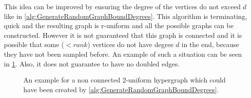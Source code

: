 This idea can be improved by ensuring the degree of the vertices do not exceed $d$ like in \cref{alg:GenerateRandomGraphBoundDegrees}. This algorithm is terminating, quick and the resulting graph is r-uniform and all the possible graphs can be constructed.
However it is not guaranteed that this graph is connected and it is possible that some ($< rank$) vertices do not have degree $d$ in the end, because they have not been sampled before. An example of such a situation can be seen in \cref{fig:exapmle_non_connected_uniform_hypergraph}.
Also, it does not guarantee to have no doubled edges.


\begin{figure} 
	\centering
	\caption[Example non connected uniform hypergraph]{An example for a non connected 2-uniform hypergraph which could have been created by \cref{alg:GenerateRandomGraphBoundDegrees}. }\label{fig:exapmle_non_connected_uniform_hypergraph}
\end{figure}



